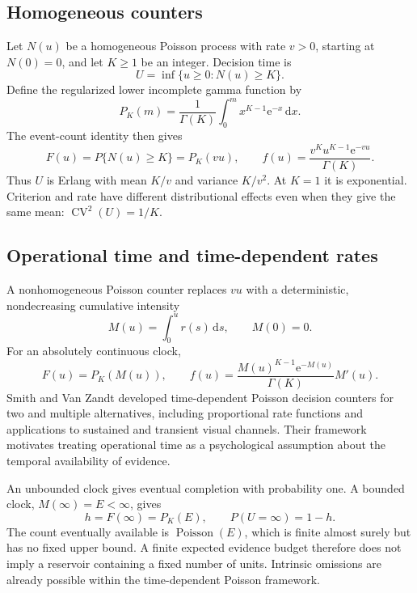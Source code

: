 \documentclass[12pt]{article}
\newcommand{\dd}{\,\mathrm{d}}
\newcommand{\e}{\mathrm{e}}
\newcommand{\Poisson}{\operatorname{Poisson}}
\theoremstyle{definition}
\theoremstyle{plain}
\theoremstyle{remark}
\begin{document}
\subsection{Homogeneous counters}
Let $N(u)$ be a homogeneous Poisson process with rate $v>0$, starting at $N(0)=0$, and let $K\geq1$ be an integer. Decision time is
\begin{equation}
 U=\inf\{u\geq0:N(u)\geq K\}.
\end{equation}
Define the regularized lower incomplete gamma function by
\begin{equation}
 P_K(m)=\frac{1}{\Gamma(K)}\int_0^m x^{K-1}\e^{-x}\dd x.
\end{equation}
The event-count identity then gives
\begin{equation}
 F(u)=P\{N(u)\geq K\}=P_K(vu),\qquad
 f(u)=\frac{v^K u^{K-1}\e^{-vu}}{\Gamma(K)}.\label{eq:erlang}
\end{equation}
Thus $U$ is Erlang with mean $K/v$ and variance $K/v^2$. At $K=1$ it is exponential. Criterion and rate have different distributional effects even when they give the same mean: $\operatorname{CV}^2(U)=1/K$.

\subsection{Operational time and time-dependent rates}\label{sec:operational}
A nonhomogeneous Poisson counter replaces $vu$ with a deterministic, nondecreasing cumulative intensity
\begin{equation}
 M(u)=\int_0^u r(s)\dd s,\qquad M(0)=0.
\end{equation}
For an absolutely continuous clock,
\begin{equation}
 F(u)=P_K(M(u)),\qquad
 f(u)=\frac{M(u)^{K-1}\e^{-M(u)}}{\Gamma(K)}M'(u).\label{eq:nhpp}
\end{equation}
Smith and Van Zandt \cite{SmithVanZandt2000} developed time-dependent Poisson decision counters for two and multiple alternatives, including proportional rate functions and applications to sustained and transient visual channels. Their framework motivates treating operational time as a psychological assumption about the temporal availability of evidence.

An unbounded clock gives eventual completion with probability one. A bounded clock, $M(\infty)=E<\infty$, gives
\begin{equation}
 h=F(\infty)=P_K(E),\qquad P(U=\infty)=1-h.\label{eq:poisson-defect}
\end{equation}
The count eventually available is $\Poisson(E)$, which is finite almost surely but has no fixed upper bound. A finite expected evidence budget therefore does not imply a reservoir containing a fixed number of units. Intrinsic omissions are already possible within the time-dependent Poisson framework.
\end{document}
